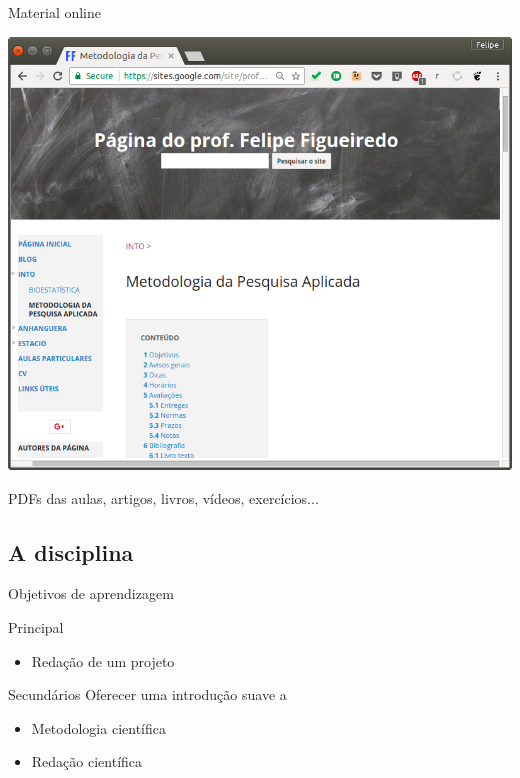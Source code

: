 \documentclass{beamer}
\begin{document}
\begin{frame}{Material online}
  \begin{center}
    \includegraphics[height=.7\textheight]{Intro/pg-disciplina}
    \begin{exampleblock}{}
      \begin{center}
        PDFs das aulas, artigos, livros, vídeos, exercícios...
      \end{center}
    \end{exampleblock}
  \end{center}
\end{frame}

\subsection{A disciplina}

\begin{frame}{Objetivos de aprendizagem}

  \begin{block}{Principal}
    \begin{itemize}
    \item Redação de um projeto
    \end{itemize}
  \end{block}

  \begin{block}{Secundários}
    Oferecer uma introdução suave a
    \begin{itemize}
    \item Metodologia científica
    \item Redação científica
    \end{itemize}
  \end{block}

\end{frame}
\end{document}
